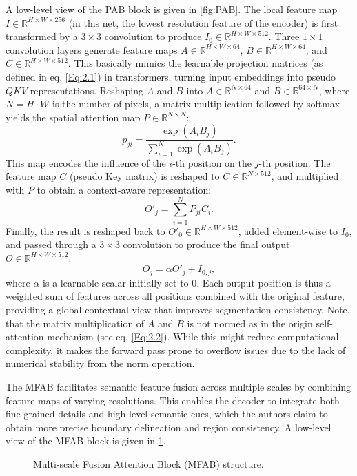 A low-level view of the PAB block is given in \ref{fig:PAB}. The local feature map $I \in \mathbb{R}^{H \times W \times 256}$ (in this net, the lowest resolution feature of the encoder) is first transformed by a $3 \times 3$ convolution to produce $I_0 \in \mathbb{R}^{H \times W \times 512}$. Three $1 \times 1$ convolution layers generate feature maps $A \in \mathbb{R}^{H \times W \times 64}$, $B \in \mathbb{R}^{H \times W \times 64}$, and $C \in \mathbb{R}^{H \times W \times 512}$. This basically mimics the learnable projection matrices (as defined in eq. \ref{Eq:2.1}) in transformers, turning input embeddings into pseudo $QKV$ representations. Reshaping $A$ and $B$ into $A \in \mathbb{R}^{N \times 64}$ and $B \in \mathbb{R}^{64 \times N}$, where $N = H \cdot W$ is the number of pixels, a matrix multiplication followed by softmax yields the spatial attention map $P \in \mathbb{R}^{N \times N}$:
\[
p_{ji} = \frac{\exp(A_i B_j)}{\sum_{i=1}^{N} \exp(A_i B_j)}.
\]
This map encodes the influence of the $i$-th position on the $j$-th position. The feature map $C$ (pseudo Key matrix) is reshaped to $C \in \mathbb{R}^{N \times 512}$, and multiplied with $P$ to obtain a context-aware representation:
\[
O'_j = \sum_{i=1}^{N} P_{ji} C_i.
\]
Finally, the result is reshaped back to $O'_0 \in \mathbb{R}^{H \times W \times 512}$, added element-wise to $I_0$, and passed through a $3 \times 3$ convolution to produce the final output $O \in \mathbb{R}^{H \times W \times 512}$:
\[
O_j = \alpha O'_j + I_{0,j},
\]
where $\alpha$ is a learnable scalar initially set to $0$. Each output position is thus a weighted sum of features across all positions combined with the original feature, providing a global contextual view that improves segmentation consistency. Note, that the matrix multiplication of $A$ and  $B$ is not normed as in the origin self-attention mechanism (see eq. \ref{Eq:2.2}). While this might reduce computational complexity, it makes the forward pass prone to overflow issues due to the lack of numerical stability from the norm operation.


The MFAB facilitates semantic feature fusion across multiple scales by combining feature maps of varying resolutions. This enables the decoder to integrate both fine-grained details and high-level semantic cues, which the authors claim to obtain more precise boundary delineation and region consistency. A low-level view of the MFAB block is given in \ref{fig:MFAB}.
\begin{figure}[!ht]
    \centering
    \caption{Multi-scale Fusion Attention Block (MFAB) structure. }
    \label{fig:MFAB}
\end{figure}


